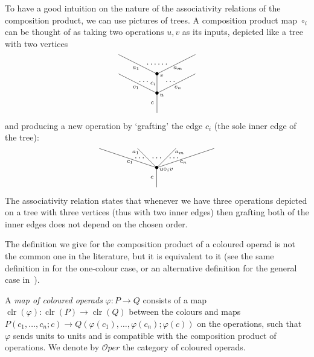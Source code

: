 \documentclass[a4paper]{amsart}
\theoremstyle{plain}
\theoremstyle{definition}
\theoremstyle{remark}
\DeclareMathOperator{\clr}{clr}
\newcommand{\To}{\longrightarrow}
\newcommand{\Oper}{\mathcal{O}per}
\numberwithin{equation}{section}
\numberwithin{figure}{section}
\begin{document}
To have a good intuition on the nature of the associativity
relations of the composition product, we can use pictures of trees.
A composition product map $\circ_i$ can be thought of as taking  two
operations $u, v$ as its inputs, depicted like a tree with two
vertices
$$
    \xy<0.08cm, 0cm>:
    (0,0)*{}="1";
    (0,10)*=0{\bullet}="2";
    (0,20)*=0{\bullet}="2a";
    (-20,20)*{}="3";
    (20,20)*{}="4";
    (-20,30)*{}="5";
    (20,30)*{}="6";
    "1";"2" **\dir{-};
    "2";"3" **\dir{-};
    "2";"4" **\dir{-};
    "2";"2a" **\dir{-};
    "2a";"5" **\dir{-};
    "2a";"6" **\dir{-};
    (-2.5,5)*=0{\scriptstyle c};
    (-11, 13)*=0{\scriptstyle c_1};
    (11, 13)*=0{\scriptstyle c_n};
    (2.5, 9)*=0{\scriptstyle u};
    (-2,15)*=0{\scriptstyle c_i};
    (-7, 16)*=0{\cdots};
    (7, 16)*=0{\cdots};
    (-11, 23)*=0{\scriptstyle a_1};
    (11, 23)*=0{\scriptstyle a_m};
    (2.5, 19)*=0{\scriptstyle v};
    (0, 25)*=0{\cdots\cdots};
    \endxy
$$
and producing a new operation by `grafting' the edge $c_i$ (the sole inner edge of the tree):
$$
    \xy<0.08cm, 0cm>:
    (0,0)*{}="1";
    (0,10)*=0{\bullet}="2";
    (-10,20)*{}="3";
    (10,20)*{}="4";
    (-30,20)*{}="5";
    (30,20)*{}="6";
    "1";"2" **\dir{-};
    "2";"3" **\dir{-};
    "2";"4" **\dir{-};
    "2";"5" **\dir{-};
    "2";"6" **\dir{-};
    (-2.5,5)*=0{\scriptstyle c};
    (-14, 13)*=0{\scriptstyle c_1};
    (12, 18)*=0{\scriptstyle a_m};
    (-11, 18)*=0{\scriptstyle a_1};
    (14, 13)*=0{\scriptstyle c_n};
    (5, 9)*=0{\scriptstyle u\circ_i v};
    (0, 15)*=0{\cdots};
    (9, 15)*=0{\cdots};
    (-9, 15)*=0{\cdots};
    \endxy
$$
The associativity relation states that whenever we have three operations depicted on a tree with three vertices (thus
with two inner edges) then grafting both of the inner edges does not depend on the chosen order.

The definition we give for the composition product of a coloured operad is not the common one in the literature, but it is
equivalent to it (see the same definition in \cite{markl} for the one-colour case, or an alternative definition for the
general case in~\cite{bergermoerdijk,leinster,moerdijkweiss}).


A \textit{map of coloured operads} $\varphi\colon P\To Q$ consists of a map $\clr(\varphi)\colon
    \clr(P)\To \clr(Q)$ between the colours and maps
$P(c_1,\ldots, c_n;c)\To Q(\varphi(c_1),\ldots,
    \varphi(c_n);\varphi(c))$ on the operations, such that $\varphi$
sends units to units and is compatible with the composition product
of operations. We denote by $\Oper$ the category of coloured operads.
\end{document}
